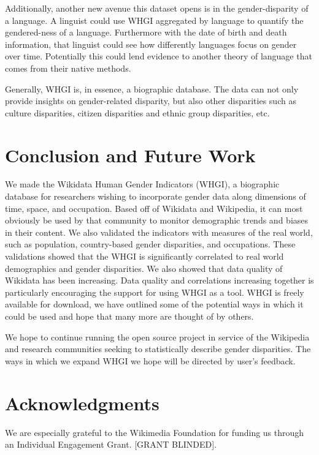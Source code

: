 \documentclass[letterpaper]{article}
\begin{document}
Additionally, another new avenue this dataset opens is in the gender-disparity of a language. A linguist could use WHGI aggregated by language to quantify the gendered-ness of a language. Furthermore with the date of birth and death information, that linguist could see how differently languages focus on gender over time. Potentially this could lend evidence to another theory of language that comes from their native methods.

Generally, WHGI is, in essence, a biographic database. The data can not only provide insights on gender-related disparity, but also other disparities such as culture disparities, citizen disparities and ethnic group disparities, etc.

\section{Conclusion and Future Work}
We made the Wikidata Human Gender Indicators (WHGI), a biographic database for researchers wishing to incorporate gender data along dimensions of time, space, and occupation. Based off of Wikidata and Wikipedia, it can most obviously be used by that community to monitor demographic trends and biases in their content. We also validated the indicators with measures of the real world, such as population, country-based gender disparities, and occupations. These validations showed that the WHGI is significantly correlated to real world demographics and gender disparities. We also showed that data quality of Wikidata has been increasing. Data quality and correlations increasing together is particularly encouraging the support for using WHGI as a tool. WHGI is freely available for download, we have outlined some of the potential ways in which it could be used and hope that many more are thought of by others.

We hope to continue running the open source project in service of the Wikipedia and research communities seeking to statistically describe gender disparities. The ways in which we expand WHGI we hope will be directed by user's feedback.


\section{ Acknowledgments}
We are especially grateful to the Wikimedia Foundation for funding us through an Individual Engagement Grant. [GRANT BLINDED].



\end{document}
